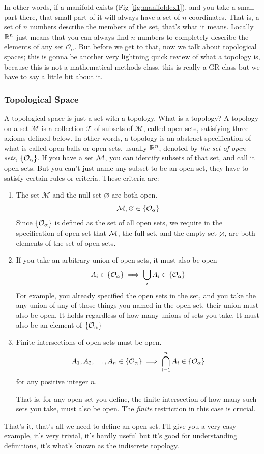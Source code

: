 		In other words, if a manifold exists (Fig \ref{fig:manifoldex1}), and you take a small part there, that small part of it will always have a set of $n$ coordinates. That is, a set of $n$ numbers describe the members of the set, that's
		what it means. Locally $\mathbb{R}^n$ just means that you can always find $n$ numbers to completely describe the elements of any set $\mathcal{O}_\alpha$. 
		But before we get to that, now we talk about topological spaces; this is gonna be another very lightning quick review of what
		a topology is, because this is not a mathematical methods class, this is really a GR class but we have to say a little bit about it.

	\subsubsection{Topological Space}
		A topological space is just a set with a topology. What is a topology? A topology on a set $\mathcal M$ is a collection $\mathcal T$ of subsets of $\mathcal M$, called open sets, satisfying three axioms defined below. 
		In other words, a topology is an abstract specification of what is called open balls or open sets, usually $\mathbb{R}^n$, denoted by \textit{the set of open sets}, $\qty{\mathcal{O}_\alpha}$.
		If you have a set $\mathcal M$, you can identify subsets of that set, and call it open sets.
		But you can't just name any subset to be an open set, they have to satisfy certain
		rules or criteria. These criteria are:
		\begin{enumerate}[(1)]
			\item The set $\mathcal{M}$ and the null set $\varnothing$ are both open. 
				\[
					\mathcal{M},\varnothing\in\qty{\mathcal{O}_\alpha}
				\]
				Since $\qty{\mathcal{O}_\alpha}$ is defined as the set of all open sets, we require in the specification of open set that $\mathcal{M}$, the full set,
				and the empty set $\varnothing$, are both elements of the set of open sets.
			\item If you take an arbitrary union of open sets, it must also be open
				\[
					A_i \in \qty{\mathcal{O}_\alpha}\implies \bigcup_i A_i \in \qty{\mathcal{O}_\alpha}
				\]
				For example, you already specified the open sets in the set, and you take the any union of any of those things you named in the open set, their union 
				must also be open. It holds regardless of how many unions of sets you take. It must also be an element of $\qty{\mathcal{O}_\alpha}$
			\item Finite intersections of open sets must be open. 
				\[
					A_1, A_2,\ldots, A_n \in \qty{\mathcal{O}_\alpha}\implies \bigcap_{i=1}^n A_i \in \qty{\mathcal{O}_\alpha}
				\]
				for any positive integer $n$.

				That is, for any open set you define, the finite intersection of how many such sets you take, must also be open. The \textit{finite} restriction in 
				this case is crucial.
		\end{enumerate}
		That's it, that's all we need to define an open set. I'll give you a very easy example, it's very trivial, it's hardly useful but it's good for understanding 
		definitions, it's what's known as the indiscrete topology. 

